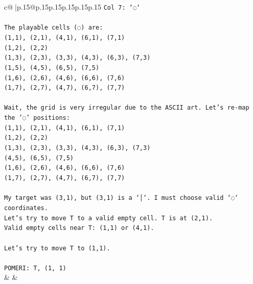\documentclass{article}
\begin{document}
{\begin{supertabular}{c@{$\;$}|p{.15\linewidth}@{}p{.15\linewidth}p{.15\linewidth}p{.15\linewidth}p{.15\linewidth}p{.15\linewidth}}
{{{\texttt{Col 7: `◌`} \\
\\ 
\texttt{The playable cells (◌) are:} \\
\texttt{(1,1), (2,1), (4,1), (6,1), (7,1)} \\
\texttt{(1,2), (2,2)} \\
\texttt{(1,3), (2,3), (3,3), (4,3), (6,3), (7,3)} \\
\texttt{(1,5), (4,5), (6,5), (7,5)} \\
\texttt{(1,6), (2,6), (4,6), (6,6), (7,6)} \\
\texttt{(1,7), (2,7), (4,7), (6,7), (7,7)} \\
\\ 
\texttt{Wait, the grid is very irregular due to the ASCII art. Let's re{-}map the '◌' positions:} \\
\texttt{(1,1), (2,1), (4,1), (6,1), (7,1)} \\
\texttt{(1,2), (2,2)} \\
\texttt{(1,3), (2,3), (3,3), (4,3), (6,3), (7,3)} \\
\texttt{(4,5), (6,5), (7,5)} \\
\texttt{(1,6), (2,6), (4,6), (6,6), (7,6)} \\
\texttt{(1,7), (2,7), (4,7), (6,7), (7,7)} \\
\\ 
\texttt{My target was (3,1), but (3,1) is a `│`. I must choose valid `◌` coordinates.} \\
\texttt{Let's try to move T to a valid empty cell. T is at (2,1).} \\
\texttt{Valid empty cells near T: (1,1) or (4,1).} \\
\\ 
\texttt{Let's try to move T to (1,1).} \\
\\ 
\texttt{POMERI: T, (1, 1)} \\
            }
        }
    }
    & & \\ \\


\end{supertabular}}
\end{document}
